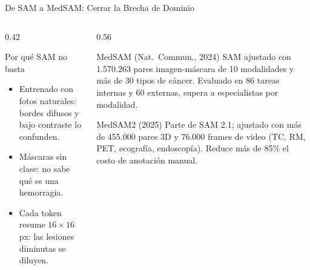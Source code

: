 \documentclass[aspectratio=169, 10pt]{beamer}
\begin{document}
\begin{frame}{De SAM a MedSAM: Cerrar la Brecha de Dominio}

	\begin{columns}[T]
		\begin{column}{0.42\textwidth}
			\begin{alertblock}{Por qu\'e SAM no basta}
				\small
				\begin{itemize}
					\item Entrenado con fotos naturales: bordes difusos y bajo contraste lo confunden.
					\item M\'ascaras sin clase: no sabe qu\'e es una hemorragia.
					\item Cada token resume $16 \times 16$ px: las lesiones diminutas se diluyen.
				\end{itemize}
			\end{alertblock}
		\end{column}

		\begin{column}{0.56\textwidth}
			\begin{block}{MedSAM (Nat.\ Commun., 2024)}
				\small
				SAM ajustado con 1.570.263 pares imagen-m\'ascara de 10 modalidades y m\'as de 30 tipos de c\'ancer. Evaluado en 86 tareas internas y 60 externas, supera a especialistas por modalidad.
			\end{block}

			\begin{block}{MedSAM2 (2025)}
				\small
				Parte de SAM 2.1; ajustado con m\'as de 455.000 pares 3D y 76.000 frames de video (TC, RM, PET, ecograf\'ia, endoscop\'ia). Reduce m\'as de 85\% el costo de anotaci\'on manual.
			\end{block}
		\end{column}
	\end{columns}

\end{frame}
\end{document}
